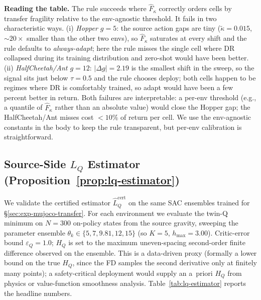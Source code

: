 \documentclass{article}
\begin{document}
\textbf{Reading the table.} The rule succeeds where $\hat F_\kappa$ correctly orders cells by transfer fragility relative to the env-agnostic threshold. It fails in two characteristic ways. (i) \emph{Hopper $g{=}5$}: the source action gaps are tiny ($\tilde\kappa{=}0.015$, ${\sim}20\times$ smaller than the other two envs), so $\hat F_\kappa$ saturates at every shift and the rule defaults to \emph{always-adapt}; here the rule misses the single cell where DR collapsed during its training distribution and zero-shot would have been better. (ii) \emph{HalfCheetah/Ant $g{=}12$}: $|\Delta g|{=}2.19$ is the smallest shift in the sweep, so the signal sits just below $\tau{=}0.5$ and the rule chooses deploy; both cells happen to be regimes where DR is comfortably trained, so adapt would have been a few percent better in return. Both failures are interpretable: a per-env threshold (e.g., a quantile of $\hat F_\kappa$ rather than an absolute value) would close the Hopper gap; the HalfCheetah/Ant misses cost ${<}10\%$ of return per cell. We use the env-agnostic constants in the body to keep the rule transparent, but per-env calibration is straightforward.

\subsection{Source-Side $L_Q$ Estimator (Proposition~\ref{prop:lq-estimator})}
\label{app:exp-lq}

We validate the certified estimator $\hat L_Q^{\mathrm{cert}}$ on the same SAC ensembles trained for \S\ref{sec:exp-mujoco-transfer}. For each environment we evaluate the twin-Q minimum on $N{=}300$ on-policy states from the source gravity, sweeping the parameter ensemble $\theta_k \in \{5, 7, 9.81, 12, 15\}$ (so $K{=}5$, $h_{\max}{=}3.00$). Critic-error bound $\varepsilon_Q{=}1.0$; $H_Q$ is set to the maximum uneven-spacing second-order finite difference observed on the ensemble. This is a data-driven proxy (formally a lower bound on the true $H_Q$, since the FD samples the second derivative only at finitely many points); a safety-critical deployment would supply an a~priori $H_Q$ from physics or value-function smoothness analysis. Table~\ref{tab:lq-estimator} reports the headline numbers.
\end{document}
